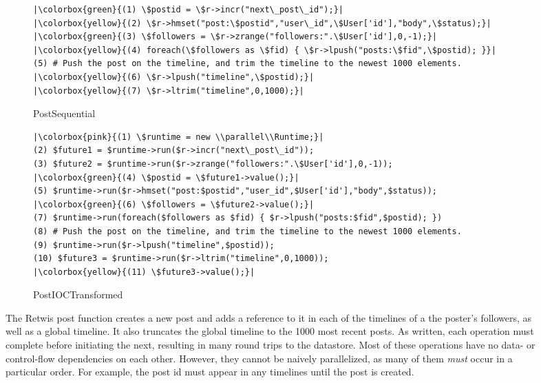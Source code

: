 \begin{figure*}[t!]
    \centering
    \begin{subfigure}[b]{\textwidth}
        \begin{verbatim}
|\colorbox{green}{(1) \$postid = \$r->incr("next\_post\_id");}|
|\colorbox{yellow}{(2) \$r->hmset("post:\$postid","user\_id",\$User['id'],"body",\$status);}|
|\colorbox{green}{(3) \$followers = \$r->zrange("followers:".\$User['id'],0,-1);}|
|\colorbox{yellow}{(4) foreach(\$followers as \$fid) { \$r->lpush("posts:\$fid",\$postid); }}|
(5) # Push the post on the timeline, and trim the timeline to the newest 1000 elements.
|\colorbox{yellow}{(6) \$r->lpush("timeline",\$postid);}|
|\colorbox{yellow}{(7) \$r->ltrim("timeline",0,1000);}|
\end{verbatim}
        \caption{PostSequential}
        \label{fig:retwissequential}
    \end{subfigure}%
    
    \begin{subfigure}[b]{\textwidth}
        \begin{verbatim}
|\colorbox{pink}{(1) \$runtime = new \\parallel\\Runtime;}|
(2) $future1 = $runtime->run($r->incr("next\_post\_id"));
(3) $future2 = $runtime->run($r->zrange("followers:".\$User['id'],0,-1));
|\colorbox{green}{(4) \$postid = \$future1->value();}|
(5) $runtime->run($r->hmset("post:$postid","user_id",$User['id'],"body",$status));
|\colorbox{green}{(6) \$followers = \$future2->value();}|
(7) $runtime->run(foreach($followers as $fid) { $r->lpush("posts:$fid",$postid); })
(8) # Push the post on the timeline, and trim the timeline to the newest 1000 elements.
(9) $runtime->run($r->lpush("timeline",$postid));
(10) $future3 = $runtime->run($r->ltrim("timeline",0,1000));
|\colorbox{yellow}{(11) \$future3->value();}|

\end{verbatim}
        \caption{PostIOCTransformed}
        \label{fig:retwistransform}
    \end{subfigure}
    \caption{The Retwis post function creates a new post and adds a reference to it in each of the timelines of a the poster's followers, as well as a global timeline. It also truncates the global timeline to the 1000 most recent posts. As written, each operation must complete before initiating the next, resulting in many round trips to the datastore. Most of these operations have no data- or control-flow dependencies on each other. However, they cannot be naively parallelized, as many of them \emph{must} occur in a particular order. For example, the post id must appear in any timelines until the post is created.}
    \label{fig:retwis-post2}
\end{figure*}

